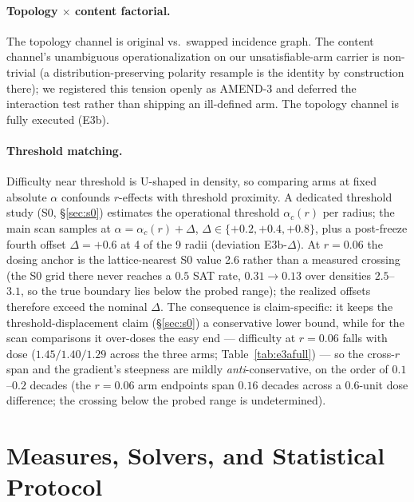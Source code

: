 \documentclass[pdflatex,sn-basic,Numbered]{sn-jnl}
\newcommand{\ac}[1]{\ensuremath{\alpha_c(#1)}}
\begin{document}
\paragraph{Topology $\times$ content factorial.}
The topology channel is original vs.\ swapped incidence graph. The content
channel's unambiguous operationalization on our unsatisfiable-arm carrier is
non-trivial (a distribution-preserving polarity resample is the identity by
construction there); we registered this tension openly as AMEND-3 and deferred
the interaction test rather than shipping an ill-defined arm. The topology
channel is fully executed (E3b).

\paragraph{Threshold matching.}
Difficulty near threshold is U-shaped in density, so comparing arms at fixed
absolute $\alpha$ confounds $r$-effects with threshold proximity. A dedicated
threshold study (S0, \S\ref{sec:s0}) estimates the operational threshold
$\ac{r}$ per radius; the main scan samples at $\alpha = \ac{r} + \Delta$,
$\Delta \in \{+0.2, +0.4, +0.8\}$, plus a post-freeze fourth offset
$\Delta{=}{+}0.6$ at 4 of the 9 radii (deviation E3b-$\Delta$). At $r{=}0.06$ the dosing anchor is the
lattice-nearest S0 value 2.6 rather than a measured crossing (the S0 grid
there never reaches a $0.5$ SAT rate, $0.31 \to 0.13$ over densities
$2.5$--$3.1$, so the true boundary lies below the probed range); the
realized offsets therefore exceed the nominal $\Delta$. The consequence is
claim-specific: it keeps the threshold-displacement claim
(\S\ref{sec:s0}) a conservative lower bound, while for the scan comparisons
it over-doses the easy end --- difficulty at $r{=}0.06$ falls with dose
($1.45/1.40/1.29$ across the three arms; Table~\ref{tab:e3afull}) --- so the
cross-$r$ span and the gradient's steepness are mildly
\emph{anti}-conservative, on the order of $0.1$--$0.2$ decades (the
$r{=}0.06$ arm endpoints span $0.16$ decades across a $0.6$-unit dose
difference; the crossing below the probed range is undetermined).

\section{Measures, Solvers, and Statistical Protocol}
\label{sec:method}
\end{document}
